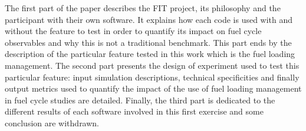 The first part of the paper describes the FIT project, its philosophy and the participant with their own software. It explains how each code is used with and without the feature to test in order to quantify its impact on fuel cycle observables and why this is not a traditional benchmark. This part ends by the description of the particular feature tested in this work which is the fuel loading management. The second part presents the design of experiment used to test this particular feature: input simulation descriptions, technical specificities and finally output metrics used to quantify the impact of the use of fuel loading management in fuel cycle studies are detailed. Finally, the third part is dedicated to the different results of each software involved in this first exercise and some conclusion are withdrawn.
